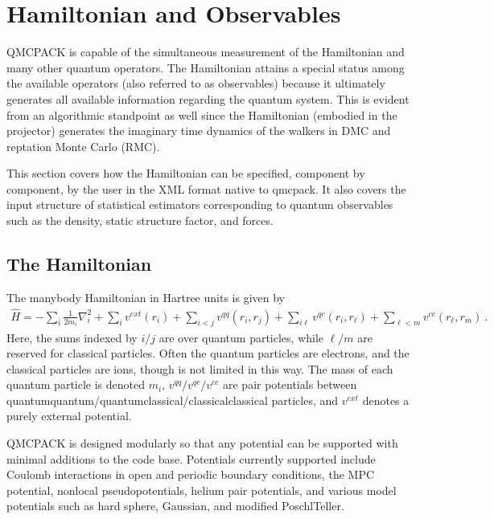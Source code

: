 \documentclass[letterpaper,10pt,english]{sphinxmanual}
\begin{document}
\chapter{Hamiltonian and Observables}
\label{\detokenize{hamiltonianobservable:hamiltonian-and-observables}}\label{\detokenize{hamiltonianobservable:hamiltobs}}\label{\detokenize{hamiltonianobservable::doc}}
QMCPACK is capable of the simultaneous measurement of the Hamiltonian and many other quantum operators.  The Hamiltonian attains a special status among the available operators (also referred to as observables) because it ultimately generates all available information regarding the quantum system.  This is evident from an algorithmic standpoint as well since the Hamiltonian (embodied in the projector) generates the imaginary time dynamics of the walkers in DMC and reptation Monte Carlo (RMC).

This section covers how the Hamiltonian can be specified, component by component, by the user in the XML format native to qmcpack. It also covers the input structure of statistical estimators corresponding to quantum observables such as the density, static structure factor, and forces.


\section{The Hamiltonian}
\label{\detokenize{hamiltonianobservable:the-hamiltonian}}
The many\sphinxhyphen{}body Hamiltonian in Hartree units is given by
\begin{equation}\label{equation:hamiltonianobservable:eq28}
\begin{split}\hat{H} = -\sum_i\frac{1}{2m_i}\nabla_i^2 + \sum_iv^{ext}(r_i) + \sum_{i<j}v^{qq}(r_i,r_j)   + \sum_{i\ell}v^{qc}(r_i,r_\ell)   + \sum_{\ell<m}v^{cc}(r_\ell,r_m)\:.\end{split}
\end{equation}
Here, the sums indexed by \(i/j\) are over quantum particles, while
\(\ell/m\) are reserved for classical particles. Often the quantum
particles are electrons, and the classical particles are ions, though is
not limited in this way. The mass of each quantum particle is denoted
\(m_i\), \(v^{qq}/v^{qc}/v^{cc}\) are pair potentials between
quantum\sphinxhyphen{}quantum/quantum\sphinxhyphen{}classical/classical\sphinxhyphen{}classical particles, and
\(v^{ext}\) denotes a purely external potential.

QMCPACK is designed modularly so that any potential can be supported with
minimal additions to the code base. Potentials currently supported
include Coulomb interactions in open and periodic boundary conditions,
the MPC potential, nonlocal pseudopotentials, helium pair potentials,
and various model potentials such as hard sphere, Gaussian, and modified
Poschl\sphinxhyphen{}Teller.
\end{document}
